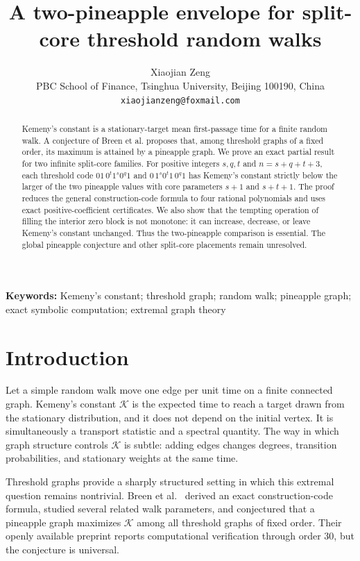 \documentclass[11pt]{article}
\title{A two-pineapple envelope for split-core threshold random walks}
\author{Xiaojian Zeng\\
\small PBC School of Finance, Tsinghua University, Beijing 100190, China\\
\small \texttt{xiaojianzeng@foxmail.com}}
\date{}
\newcommand{\K}{\mathcal{K}}
\begin{document}
\maketitle

\begin{abstract}
Kemeny's constant is a stationary-target mean first-passage time for a finite
random walk.  A conjecture of Breen et al. proposes that, among threshold graphs
of a fixed order, its maximum is attained by a pineapple graph.  We prove an
exact partial result for two infinite split-core families.  For positive integers
$s,q,t$ and $n=s+q+t+3$, each threshold code
$01\,0^t1^s0^q1$ and $0\,1^s0^t1\,0^q1$ has Kemeny's constant strictly below
the larger of the two pineapple values with core parameters $s+1$ and
$s+t+1$.  The proof reduces the general construction-code formula to four
rational polynomials and uses exact positive-coefficient certificates.  We also
show that the tempting operation of filling the interior zero block is not
monotone: it can increase, decrease, or leave Kemeny's constant unchanged.
Thus the two-pineapple comparison is essential.  The global pineapple conjecture
and other split-core placements remain unresolved.
\end{abstract}

\noindent\textbf{Keywords:} Kemeny's constant; threshold graph; random walk;
pineapple graph; exact symbolic computation; extremal graph theory

\section{Introduction}

Let a simple random walk move one edge per unit time on a finite connected
graph.  Kemeny's constant $\K$ is the expected time to reach a target drawn
from the stationary distribution, and it does not depend on the initial
vertex.  It is simultaneously a transport statistic and a spectral quantity.
The way in which graph structure controls $\K$ is subtle: adding edges changes
degrees, transition probabilities, and stationary weights at the same time.

Threshold graphs provide a sharply structured setting in which this extremal
question remains nontrivial.  Breen et al.~\cite{BreenEtAl2025} derived an exact
construction-code formula, studied several related walk parameters, and
conjectured that a pineapple graph maximizes $\K$ among all threshold graphs of
fixed order.  Their openly available preprint reports computational verification
through order $30$, but the conjecture is universal.
\end{document}
